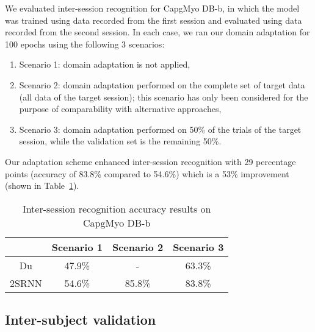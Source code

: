 \documentclass[conference]{IEEEtran}
\begin{document}
We evaluated inter-session recognition for CapgMyo DB-b,
in which the model was trained using data recorded from the first session and evaluated using data recorded from the second session.
In each case, we ran our domain adaptation for 100 epochs using the following 3 scenarios:
\begin{enumerate}
	\item Scenario 1: domain adaptation is not applied,
	\item Scenario 2: domain adaptation performed on the complete set of target data (all data of the target session); this scenario has only been considered for the purpose of comparability with alternative approaches,
	\item Scenario 3: domain adaptation performed on 50\% of the trials of the target session, while the validation set is the remaining 50\%.
\end{enumerate}
Our adaptation scheme enhanced inter-session recognition with 29 percentage points (accuracy of 83.8\% compared to 54.6\%) which is a 53\% improvement (shown in Table~\ref{table:inter-session}). 

\begin{table}[tpb]
	\centering
	\begin{threeparttable}
		\def\arraystretch{1.5}\begin{tabular}{|c|c|c|c|} 
			\hline
			& Scenario 1 & Scenario 2 & Scenario 3 \\
			\hline
			Du\cite{b18} & 47.9\% & - & 63.3\% \\
			2SRNN & 54.6\% & 85.8\% & 83.8\% \\
			\hline
		\end{tabular}
		\caption{Inter-session recognition accuracy results on CapgMyo DB-b}
		\label{table:inter-session}
	\end{threeparttable}
\end{table}

\subsection{Inter-subject validation}
\end{document}
